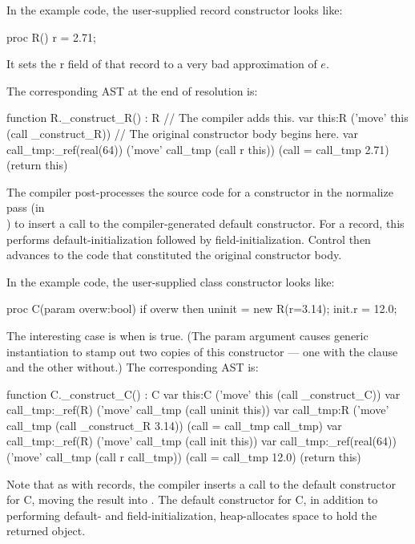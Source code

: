 In the example code, the user-supplied record constructor looks like:
\begin{chapel}
  proc R() { r = 2.71; }
\end{chapel}
\noindent
It sets the r field of that record to a very bad approximation of $e$.

The corresponding AST at the end of resolution is:
\begin{chapelcode}
  function R._construct_R() : R
  {
    // The compiler adds this.
    var this:R
    ('move' this (call _construct_R))
    // The original constructor body begins here.
    var call_tmp:_ref(real(64))
    ('move' call_tmp (call r this))
    (call = call_tmp 2.71)
    (return this)
  }
\end{chapelcode}

The compiler post-processes the source code for a constructor in the normalize pass (in\\ 
) to insert a call to the compiler-generated default
constructor.  For a record, this performs default-initialization followed by
field-initialization.  Control then advances to the code that constituted the original
constructor body.

In the example code, the user-supplied class constructor looks like:
\begin{chapel}
  proc C(param overw:bool)
  {
    if overw then
    {
      uninit = new R(r=3.14);
      init.r = 12.0;
    }
  }
\end{chapel}

The interesting case is when  is true.  (The param argument causes generic
instantiation to stamp out two copies of this constructor --- one with the 
 clause and the other without.)  The corresponding AST is:
\begin{chapelcode}
  function C._construct_C() : C
  {
    var this:C
    ('move' this (call _construct_C))
    {
      var call_tmp:_ref(R)
      ('move' call_tmp (call uninit this))
      var call_tmp:R
      ('move' call_tmp (call _construct_R 3.14))
      (call = call_tmp call_tmp)
      var call_tmp:_ref(R)
      ('move' call_tmp (call init this))
      var call_tmp:_ref(real(64))
      ('move' call_tmp (call r call_tmp))
      (call = call_tmp 12.0)
    }
    (return this)
  }
\end{chapelcode}

Note that as with records, the compiler inserts a call to the default constructor for C,
moving the result into .  The default constructor for C, in addition to
performing default- and field-initialization, heap-allocates space to hold the returned object.


